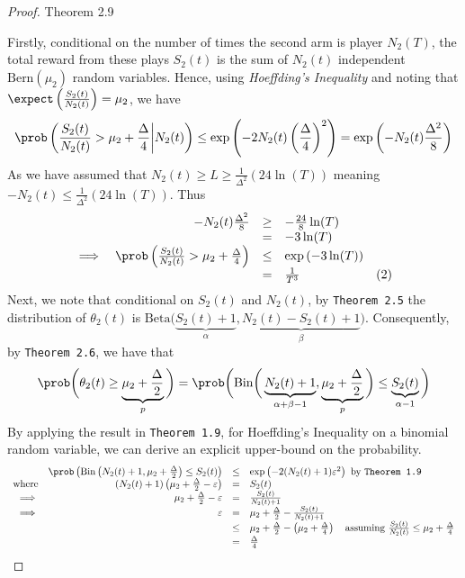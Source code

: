 \documentclass[11pt,a4paper]{article}
\begin{document}
\begin{proof}{Theorem 2.9}
  \par Firstly, conditional on the number of times the second arm is player $N_2(T)$, the total reward from these plays $S_2(t)$ is the sum of $N_2(t)$ independent $\text{Bern}(\mu_2)$ random variables. Hence, using \textit{Hoeffding's Inequality} and noting that $\textstyle\expect\left(\frac{S_2(t)}{N_2(t)}\right)=\mu_2$, we have
  \[ \prob\left(\frac{S_2(t)}{N_2(t)}>\mu_2+\frac\Delta4\bigg|N_2(t)\right)\leq\exp\left(-2N_2(t)\left(\frac\Delta4\right)^2\right)=\exp\left(-N_2(t)\frac{\Delta^2}8\right) \]
  As we have assumed that $N_2(t)\geq L\geq\frac1{\Delta^2}(24\ln(T))$ meaning $-N_2(t)\leq\frac1{\Delta^2}(24\ln(T))$. Thus
  \[\begin{array}{rrcll}
  &-N_2(t)\frac{\Delta^2}8&\geq&-\frac{24}{8}\ln(T)\\
  &&=&-3\ln(T)\\
  \implies&\prob\left(\frac{S_2(t)}{N_2(t)}>\mu_2+\frac\Delta4\right)&\leq&\exp\left(-3\ln(T)\right)\\
  &&=&\frac1{T^3}&(2)
  \end{array}\]
  Next, we note that conditional on $S_2(t)$ and $N_2(t)$, by \texttt{Theorem 2.5}  the distribution of $\theta_2(t)$ is ${\text{Beta}\big(\underbrace{S_2(t)+1}_\alpha,\underbrace{N_2(t)-S_2(t)+1}_\beta\big)}$. Consequently, by \texttt{Theorem 2.6}, we have that
  \[ \prob\bigg(\theta_2(t)\geq\underbrace{\mu_2+\frac\Delta2}_p\bigg)=\prob\bigg(\text{Bin}\bigg(\underbrace{N_2(t)+1}_{\alpha+\beta-1},\underbrace{\mu_2+\frac\Delta2}_p\bigg)\leq \underbrace{S_2(t)}_{\alpha-1}\bigg) \]
  By applying the result in \texttt{Theorem 1.9}, for Hoeffding's Inequality on a binomial random variable, we can derive an explicit upper-bound on the probability.
  \[\begin{array}{rrcl}
    &\prob\left(\text{Bin}\left(N_2(t)+1,\mu_2+\frac\Delta2\right)\leq S_2(t)\right)&\leq& \exp\left(-2(N_2(t)+1)\varepsilon^2\right)\text{ by \texttt{Theorem 1.9}}\\
    \text{where}&\left(N_2(t)+1\right)\left(\mu_2+\frac\Delta2-\varepsilon\right)&=&S_2(t)\\
    \implies&\mu_2+\frac\Delta2-\varepsilon&=&\frac{S_2(t)}{N_2(t)+1}\\
    \implies&\varepsilon&=&\mu_2+\frac\Delta2-\frac{S_2(t)}{N_2(t)+1}\\
    &&\leq&\mu_2+\frac\Delta2-\left(\mu_2+\frac\Delta4\right)\quad\text{assuming }\frac{S_2(t)}{N_2(t)}\leq\mu_2+\frac\Delta4\\
    &&=&\frac\Delta4\\

\end{array}\]
\end{proof}
\end{document}
